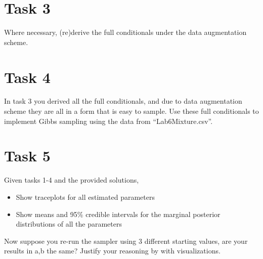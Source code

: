 \documentclass{article}
\begin{document}
\section*{Task 3}
Where necessary, (re)derive the full conditionals under the data augmentation scheme.

\section*{Task 4}

In task 3 you derived all the full conditionals, and due to data augmentation scheme they are all in a form that is easy to sample. Use these full conditionals to implement Gibbs sampling using the data from ``Lab6Mixture.csv''.

\section*{Task 5}
Given tasks 1-4 and the provided solutions,
\begin{itemize}
\item Show traceplots for all estimated parameters
\item Show means and 95\% credible intervals for the marginal posterior distributions of all the parameters
\end{itemize}
Now suppose you re-run the sampler using 3 different starting values, are your results in a,b the same? Justify your reasoning by with visualizations.
\end{document}
